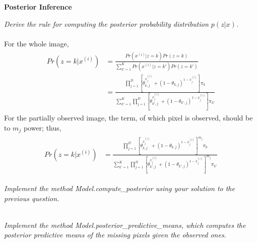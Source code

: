 \documentclass{myhw}
\begin{document}
\begin{homeworkProblem}
\textbf{Posterior Inference}
\begin{homeworkSection}
\emph{Derive the rule for computing the posterior probability distribution $p(z|x)$. } \\
\\
For the whole image, 
\begin{gather*}
\begin{aligned}
Pr(z=k|x^{(i)}) & = \frac{Pr(x^{(i)}|z=k) Pr(z=k)}{\sum_{k'=1}^K Pr(x^{(i)}|z=k') Pr(z=k') } \\
& = \frac{ \prod_{j=1}^D [ \theta_{k,j}^{x_j^{(i)}} + (1-\theta_{k,j})^{1-x_j^{(i)}} ] \pi_k }{ \sum_{k'=1}^K \prod_{j=1}^D [ \theta_{k',j}^{x_j^{(i)}} + (1-\theta_{k',j})^{1-x_j^{(i)}} ] \pi_{k'}}
\end{aligned}
\end{gather*}
For the partially observed image, the term, of which pixel is observed, should be to $m_j$ power; thus, 
\begin{gather*}
\begin{aligned}
Pr(z=k|x^{(i)}) & = \frac{ \prod_{j=1}^D [ \theta_{k,j}^{x_j^{(i)}} + (1-\theta_{k,j})^{1-x_j^{(i)}} ]^{m_j} \pi_k }{ \sum_{k'=1}^K \prod_{j=1}^D [ \theta_{k',j}^{x_j^{(i)}} + (1-\theta_{k',j})^{1-x_j^{(i)}} ]^{m_j} \pi_{k'}}
\end{aligned}
\end{gather*}
\end{homeworkSection}
\begin{homeworkSection}
\emph{Implement the method Model.compute\_posterior using your solution to the previous question. } \\
\\
\end{homeworkSection}
\begin{homeworkSection}	
\emph{Implement the method Model.posterior\_predictive\_means, which computes the posterior predictive means of the missing pixels given the observed ones.} \\
\\
\end{homeworkSection}
\begin{homeworkSection}	
\emph{} \\
\\
\end{homeworkSection}
\end{homeworkProblem}
\end{document}

